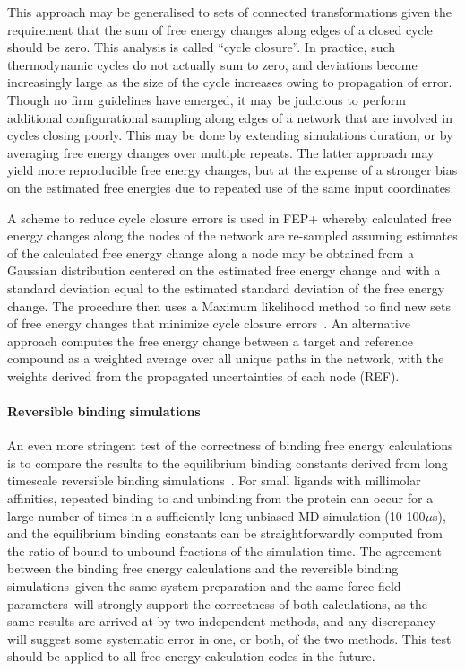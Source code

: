 \documentclass[9pt,bestpractices]{livecoms}
\begin{document}
This approach may be generalised to sets of connected transformations given the requirement that the sum of free energy changes along edges of a closed cycle should be zero. This analysis is called ``cycle closure''. In practice, such thermodynamic cycles do not actually sum to zero,  and deviations become increasingly large as the size of the cycle increases owing to propagation of error. Though no firm guidelines have emerged, it may be judicious to perform additional configurational sampling along edges of a network that are involved in cycles closing poorly. This may be done by extending simulations duration, or by averaging free energy changes over multiple repeats. The latter approach may yield more reproducible free energy changes, but at the expense of a stronger bias on the estimated free energies due to repeated use of the same input coordinates.

A scheme to reduce cycle closure errors is used in FEP+ whereby calculated free energy changes along the nodes of the network are re-sampled assuming estimates of the calculated free energy change along a node may be obtained from a Gaussian distribution centered on the estimated free energy change and with a standard deviation equal to the estimated standard deviation of the free energy change. The procedure then uses a Maximum likelihood method to find new sets of free energy changes that minimize cycle closure errors~\cite{wang2013modeling}. An alternative approach computes the free energy change between a target and reference compound as a weighted average over all unique paths in the network, with the weights derived from the propagated uncertainties of each node (REF). 

\paragraph{Reversible binding simulations}
An even more stringent test of the correctness of binding free energy calculations is to compare the results to the equilibrium binding constants derived from long timescale reversible binding simulations~\cite{pan2017quantitative}.  For small ligands with millimolar affinities, repeated binding to and unbinding from the protein can occur for a large number of times in a sufficiently long unbiased MD simulation (10-100$\mu$s), and the equilibrium binding constants can be straightforwardly computed from the ratio of bound to unbound fractions of the simulation time.  The agreement between the binding free energy calculations and the reversible binding simulations--given the same system preparation and the same force field parameters--will strongly support the correctness of both calculations, as the same results are arrived at by two independent methods, and any discrepancy will suggest some systematic error in one, or both, of the two methods.  This test should be applied to all free energy calculation codes in the future.
\end{document}
